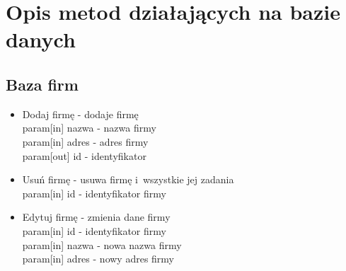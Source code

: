 \documentclass[a4paper]{article}
\begin{document}

\section{Opis metod działających na bazie danych}

\subsection{Baza firm}
\begin{itemize}
    \item Dodaj firmę - dodaje firmę    \\
        param[in] nazwa - nazwa firmy   \\
        param[in] adres  - adres firmy    \\
        param[out] id   - identyfikator \\
    \item Usuń firmę - usuwa firmę i~wszystkie jej zadania \\
        param[in] id  - identyfikator firmy \\
    \item Edytuj firmę - zmienia dane firmy \\
        param[in] id - identyfikator firmy  \\
        param[in] nazwa - nowa nazwa firmy  \\
        param[in] adres - nowy adres firmy
\end{itemize}
\end{document}
